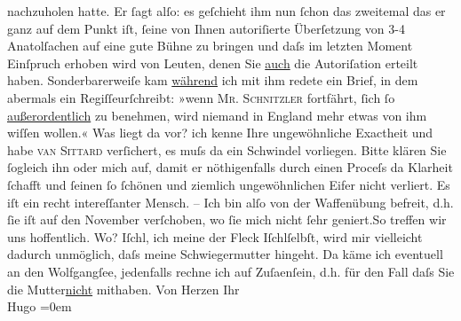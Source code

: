 \begin{ledgroupsized}[t]{13cm}
               nachzuholen hatte. Er ſagt alſo: es geſchieht ihm nun ſchon das zweitemal das er ganz
               auf dem Punkt iſt, ſeine von Ihnen autoriſierte Überſetzung von 3-4 Anatolſachen auf eine {\pb}gute Bühne zu bringen und daſs im
               letzten Moment Einſpruch erhoben wird von Leuten, denen Sie \uline{auch} die Autoriſation erteilt haben. Sonderbarerweiſe kam \uline{während} ich mit ihm redete ein Brief, in dem abermals ein
                  Regiſſeurſchreibt: »wenn \textsc{Mr.
                  Schnitzler} fortfährt, ſich ſo \uline{außerordentlich}
               zu benehmen, wird niemand in England mehr etwas von
               ihm wiſſen {\pb}wollen.« Was liegt da
               vor? ich kenne Ihre ungewöhnliche Exactheit und habe \textsc{van Sittard} verſichert, es muſs da ein
               Schwindel vorliegen. Bitte klären Sie ſogleich ihn oder mich auf, damit er
               nöthigenfalls durch einen Proceſs da Klarheit ſchafft und ſeinen ſo ſchönen und
               ziemlich ungewöhnlichen Eifer nicht verliert. Es iſt ein recht intereſſanter
               Mensch.\pend
           \pstart
           \centering{}{\pb}–\pend
           \pstart
           \noindent{}Ich bin alſo von der Waffenübung befreit, d.h. ſie iſt auf den November
               verſchoben, wo ſie mich nicht ſehr geniert.\hspace*{1.5em}So
               treffen wir uns hoffentlich. Wo? Iſchl, ich meine
               der Fleck Iſchlſelbſt, wird mir vielleicht dadurch unmöglich, daſs
               meine Schwiegermutter hingeht.
               Da käme ich eventuell an den Wolfgangſee,
               jedenfalls rechne ich auf Zuſa{\geminationm}enſein, d.h. für den Fall
               daſs Sie die Mutter\uline{nicht} mithaben.\pend
           \pstart
           Von Herzen Ihr{\\[\baselineskip]}\spacefill\mbox{Hugo}\pend
           \leftskip=0em{}
         
         \endnumbering{}\end{ledgroupsized}  \newcommand{\dateiname}{L01426}\newcommand{\titel}{Hugo von Hofmannsthal an Arthur Schnitzler, 12. 8. 1904}\newcommand{\editorInnen}{Martin Anton Müller und Gerd-Hermann Susen}
      